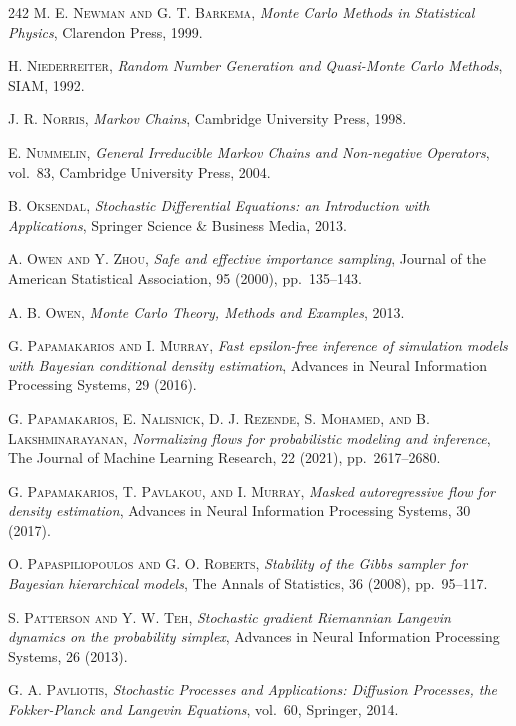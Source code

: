 \begin{thebibliography}{242}
\textsc{M. E. Newman and G. T. Barkema},
\textit{Monte Carlo Methods in Statistical Physics},
Clarendon Press, 1999.

\textsc{H. Niederreiter},
\textit{Random Number Generation and Quasi-Monte Carlo Methods},
SIAM, 1992.

\textsc{J. R. Norris},
\textit{Markov Chains},
Cambridge University Press, 1998.

\textsc{E. Nummelin},
\textit{General Irreducible Markov Chains and Non-negative Operators},
vol.\ 83, Cambridge University Press, 2004.

\textsc{B. Oksendal},
\textit{Stochastic Differential Equations: an Introduction with Applications},
Springer Science \& Business Media, 2013.

\textsc{A. Owen and Y. Zhou},
\textit{Safe and effective importance sampling},
Journal of the American Statistical Association, 95 (2000), pp.\ 135--143.

\textsc{A. B. Owen},
\textit{Monte Carlo Theory, Methods and Examples},
2013.

\textsc{G. Papamakarios and I. Murray},
\textit{Fast epsilon-free inference of simulation models with Bayesian conditional density estimation},
Advances in Neural Information Processing Systems, 29 (2016).

\textsc{G. Papamakarios, E. Nalisnick, D. J. Rezende, S. Mohamed, and B. Lakshminarayanan},
\textit{Normalizing flows for probabilistic modeling and inference},
The Journal of Machine Learning Research, 22 (2021), pp.\ 2617--2680.

\textsc{G. Papamakarios, T. Pavlakou, and I. Murray},
\textit{Masked autoregressive flow for density estimation},
Advances in Neural Information Processing Systems, 30 (2017).

\textsc{O. Papaspiliopoulos and G. O. Roberts},
\textit{Stability of the Gibbs sampler for Bayesian hierarchical models},
The Annals of Statistics, 36 (2008), pp.\ 95--117.

\textsc{S. Patterson and Y. W. Teh},
\textit{Stochastic gradient Riemannian Langevin dynamics on the probability simplex},
Advances in Neural Information Processing Systems, 26 (2013).

\textsc{G. A. Pavliotis},
\textit{Stochastic Processes and Applications: Diffusion Processes, the Fokker-Planck and Langevin Equations},
vol.\ 60, Springer, 2014.


\end{thebibliography}
